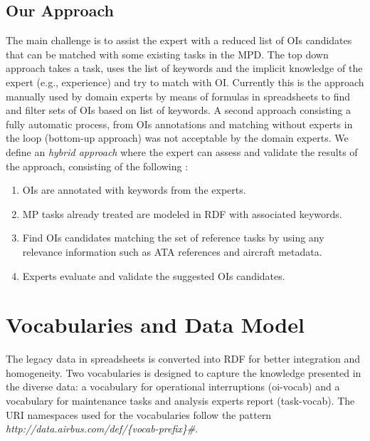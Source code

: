\documentclass[a4paper,english,submission]{rnti}  %
\begin{document}
\subsection{Our Approach}
\label{sec:approach}
The main challenge is to assist the expert with a reduced list of OIs candidates that can be matched with some existing tasks in the MPD. The top down approach takes a task, uses the list of keywords and the implicit knowledge of the expert (e.g., experience) and try to match with OI. Currently this is the approach manually used by domain experts by means of formulas in spreadsheets to find and filter sets of OIs based on list of keywords. A second approach consisting a fully automatic process, from OIs annotations and matching without experts in the loop (bottom-up approach) was not acceptable by the domain experts. We define an \textit{hybrid approach} where the expert can assess and validate the results of the approach, consisting of the following :
\begin{enumerate}
\item OIs are annotated with keywords from the experts.
\item MP tasks already treated are modeled in RDF with associated keywords.
\item Find OIs candidates matching the set of reference tasks by using any relevance information such as ATA references and aircraft metadata.
\item Experts evaluate and validate the suggested OIs candidates.
\end{enumerate}  



\section{Vocabularies and Data Model}
\label{sec:data-model}
The legacy data in spreadsheets is converted into RDF for better integration and homogeneity. Two vocabularies is designed to capture the knowledge presented in the diverse data: a vocabulary for operational interruptions (oi-vocab) and a vocabulary for maintenance tasks and analysis experts report (task-vocab). The URI namespaces used for the vocabularies follow the pattern \textit{http://data.airbus.com/def/\{vocab-prefix\}\#}. 
\end{document}
